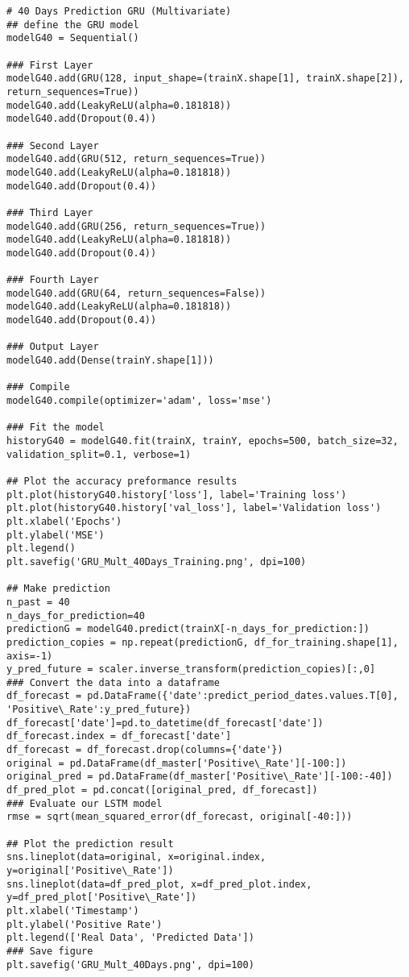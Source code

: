 \begin{appendices}
\begin{verbatim}
# 40 Days Prediction GRU (Multivariate)
## define the GRU model
modelG40 = Sequential()

### First Layer
modelG40.add(GRU(128, input_shape=(trainX.shape[1], trainX.shape[2]), return_sequences=True))
modelG40.add(LeakyReLU(alpha=0.181818))
modelG40.add(Dropout(0.4))

### Second Layer
modelG40.add(GRU(512, return_sequences=True))
modelG40.add(LeakyReLU(alpha=0.181818))
modelG40.add(Dropout(0.4))

### Third Layer
modelG40.add(GRU(256, return_sequences=True))
modelG40.add(LeakyReLU(alpha=0.181818))
modelG40.add(Dropout(0.4))

### Fourth Layer
modelG40.add(GRU(64, return_sequences=False))
modelG40.add(LeakyReLU(alpha=0.181818))
modelG40.add(Dropout(0.4))

### Output Layer
modelG40.add(Dense(trainY.shape[1]))

### Compile
modelG40.compile(optimizer='adam', loss='mse')

### Fit the model
historyG40 = modelG40.fit(trainX, trainY, epochs=500, batch_size=32, validation_split=0.1, verbose=1)

## Plot the accuracy preformance results
plt.plot(historyG40.history['loss'], label='Training loss')
plt.plot(historyG40.history['val_loss'], label='Validation loss')
plt.xlabel('Epochs')
plt.ylabel('MSE')
plt.legend()
plt.savefig('GRU_Mult_40Days_Training.png', dpi=100)

## Make prediction
n_past = 40
n_days_for_prediction=40  
predictionG = modelG40.predict(trainX[-n_days_for_prediction:])
prediction_copies = np.repeat(predictionG, df_for_training.shape[1], axis=-1)
y_pred_future = scaler.inverse_transform(prediction_copies)[:,0]
### Convert the data into a dataframe
df_forecast = pd.DataFrame({'date':predict_period_dates.values.T[0], 'Positive\_Rate':y_pred_future})
df_forecast['date']=pd.to_datetime(df_forecast['date'])
df_forecast.index = df_forecast['date']
df_forecast = df_forecast.drop(columns={'date'})
original = pd.DataFrame(df_master['Positive\_Rate'][-100:])
original_pred = pd.DataFrame(df_master['Positive\_Rate'][-100:-40])
df_pred_plot = pd.concat([original_pred, df_forecast])
### Evaluate our LSTM model
rmse = sqrt(mean_squared_error(df_forecast, original[-40:]))

## Plot the prediction result
sns.lineplot(data=original, x=original.index, y=original['Positive\_Rate'])
sns.lineplot(data=df_pred_plot, x=df_pred_plot.index, y=df_pred_plot['Positive\_Rate'])
plt.xlabel('Timestamp')
plt.ylabel('Positive Rate')
plt.legend(['Real Data', 'Predicted Data'])
### Save figure
plt.savefig('GRU_Mult_40Days.png', dpi=100)
\end{verbatim}
\end{appendices}